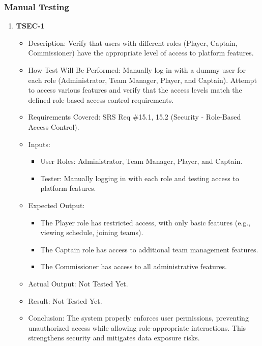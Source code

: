 \documentclass[12pt, titlepage]{article}
\begin{document}
\subsubsection{Manual Testing}
\begin{enumerate}
    \item \textbf{TSEC-1}  
    \begin{itemize}
        \item Description: Verify that users with different roles (Player, Captain, Commissioner) have the appropriate level of access to platform features.
        \item How Test Will Be Performed: Manually log in with a dummy user for each role (Administrator, Team Manager, Player, and Captain). Attempt to access various features and verify that the access levels match the defined role-based access control requirements.
        \item Requirements Covered: SRS Req \#15.1, 15.2 (Security - Role-Based Access Control).
        \item Inputs:  
            \begin{itemize}
                \item User Roles: Administrator, Team Manager, Player, and Captain.
                \item Tester: Manually logging in with each role and testing access to platform features.
            \end{itemize}
        \item Expected Output:  
            \begin{itemize}
                \item The Player role has restricted access, with only basic features (e.g., viewing schedule, joining teams).
                \item The Captain role has access to additional team management features.
                \item The Commissioner has access to all administrative features.
            \end{itemize}
        \item Actual Output: Not Tested Yet.
        \item Result: Not Tested Yet.
        \item Conclusion: The system properly enforces user permissions, preventing unauthorized access while allowing role-appropriate interactions.
		This strengthens security and mitigates data exposure risks.
    \end{itemize}


\end{enumerate}
\end{document}
